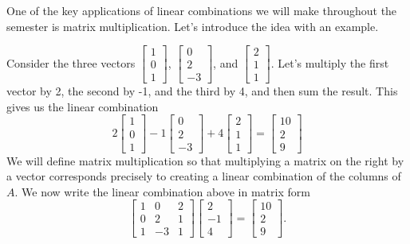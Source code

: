One of the key applications of linear combinations we will make throughout the semester is matrix multiplication. Let's introduce the idea with an example.  
\begin{example}
Consider the three vectors 
$\begin{bmatrix}1\\0\\1\end{bmatrix}$,
$\begin{bmatrix}0\\2\\-3\end{bmatrix}$,
and 
$\begin{bmatrix}2\\1\\1\end{bmatrix}$.
Let's multiply the first vector by 2, the second by -1, and the third by 4, and then sum the result.  
This gives us the linear combination
$$2\begin{bmatrix}1\\0\\1\end{bmatrix}
-1\begin{bmatrix}0\\2\\-3\end{bmatrix}
+4\begin{bmatrix}2\\1\\1\end{bmatrix}
=
\begin{bmatrix}10\\2\\9\end{bmatrix} 
$$
We will define matrix multiplication so that multiplying a matrix on the right by a vector corresponds precisely to creating a linear combination of the columns of $A$. 
We now write the linear combination above in matrix form 
$$ 
\begin{bmatrix}1&0&2\\0&2&1\\1&-3&1\end{bmatrix}
\begin{bmatrix}2\\-1\\4\end{bmatrix}
=
\begin{bmatrix}10\\2\\9\end{bmatrix} 
.$$
\end{example}

